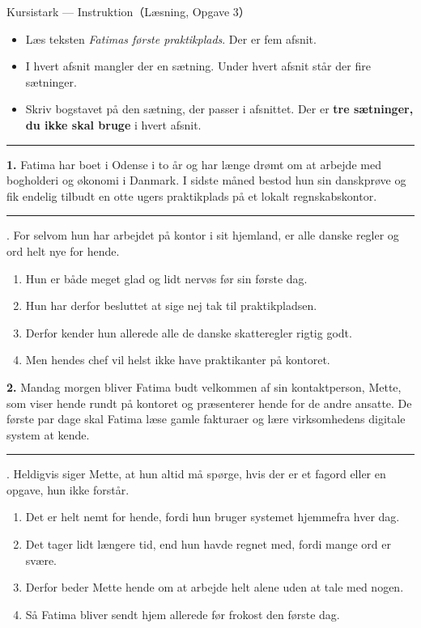 \begin{emailbox}{Kursistark --- Instruktion（Læsning, Opgave 3）}
\begin{itemize}
  \item Læs teksten \textit{Fatimas første praktikplads}. Der er fem afsnit.
  \item I hvert afsnit mangler der en sætning. Under hvert afsnit står der fire sætninger.
  \item Skriv bogstavet på den sætning, der passer i afsnittet. Der er \textbf{tre sætninger, du ikke skal bruge} i hvert afsnit.
\end{itemize}

\vspace{0.35em}
\hrule
\vspace{0.45em}

\textbf{1.} Fatima har boet i Odense i to år og har længe drømt om at arbejde med bogholderi og økonomi i Danmark. I sidste måned bestod hun sin danskprøve og fik endelig tilbudt en otte ugers praktikplads på et lokalt regnskabskontor. \rule{3.2cm}{0.4pt}. For selvom hun har arbejdet på kontor i sit hjemland, er alle danske regler og ord helt nye for hende.
\begin{enumerate}[label=\textbf{\Alph*.}, leftmargin=1.8em, itemsep=0.12em, topsep=0.25em]
  \item Hun er både meget glad og lidt nervøs før sin første dag.
  \item Hun har derfor besluttet at sige nej tak til praktikpladsen.
  \item Derfor kender hun allerede alle de danske skatteregler rigtig godt.
  \item Men hendes chef vil helst ikke have praktikanter på kontoret.
\end{enumerate}

\vspace{0.4em}
\textbf{2.} Mandag morgen bliver Fatima budt velkommen af sin kontaktperson, Mette, som viser hende rundt på kontoret og præsenterer hende for de andre ansatte. De første par dage skal Fatima læse gamle fakturaer og lære virksomhedens digitale system at kende. \rule{3.2cm}{0.4pt}. Heldigvis siger Mette, at hun altid må spørge, hvis der er et fagord eller en opgave, hun ikke forstår.
\begin{enumerate}[label=\textbf{\Alph*.}, leftmargin=1.8em, itemsep=0.12em, topsep=0.25em]
  \item Det er helt nemt for hende, fordi hun bruger systemet hjemmefra hver dag.
  \item Det tager lidt længere tid, end hun havde regnet med, fordi mange ord er svære.
  \item Derfor beder Mette hende om at arbejde helt alene uden at tale med nogen.
  \item Så Fatima bliver sendt hjem allerede før frokost den første dag.
\end{enumerate}


\end{emailbox}
